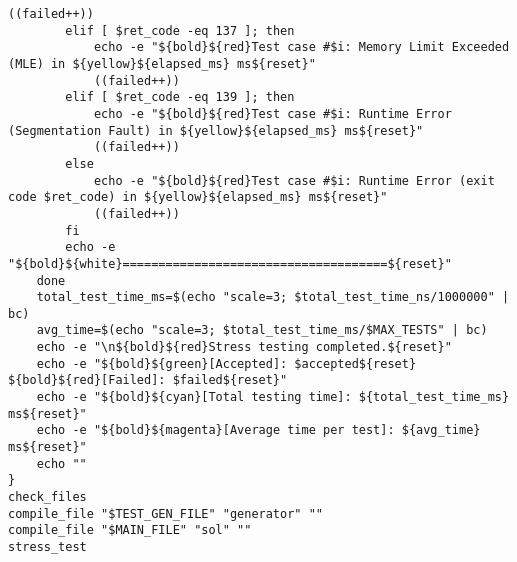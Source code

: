 \begin{lstlisting}[style=bashstyle]
            ((failed++))
        elif [ $ret_code -eq 137 ]; then
            echo -e "${bold}${red}Test case #$i: Memory Limit Exceeded (MLE) in ${yellow}${elapsed_ms} ms${reset}"
            ((failed++))
        elif [ $ret_code -eq 139 ]; then
            echo -e "${bold}${red}Test case #$i: Runtime Error (Segmentation Fault) in ${yellow}${elapsed_ms} ms${reset}"
            ((failed++))
        else
            echo -e "${bold}${red}Test case #$i: Runtime Error (exit code $ret_code) in ${yellow}${elapsed_ms} ms${reset}"
            ((failed++))
        fi
        echo -e "${bold}${white}=====================================${reset}"
    done
    total_test_time_ms=$(echo "scale=3; $total_test_time_ns/1000000" | bc)
    avg_time=$(echo "scale=3; $total_test_time_ms/$MAX_TESTS" | bc)
    echo -e "\n${bold}${red}Stress testing completed.${reset}"
    echo -e "${bold}${green}[Accepted]: $accepted${reset}    ${bold}${red}[Failed]: $failed${reset}"
    echo -e "${bold}${cyan}[Total testing time]: ${total_test_time_ms} ms${reset}"
    echo -e "${bold}${magenta}[Average time per test]: ${avg_time} ms${reset}"
    echo ""
}
check_files
compile_file "$TEST_GEN_FILE" "generator" ""
compile_file "$MAIN_FILE" "sol" ""
stress_test
\end{lstlisting}

